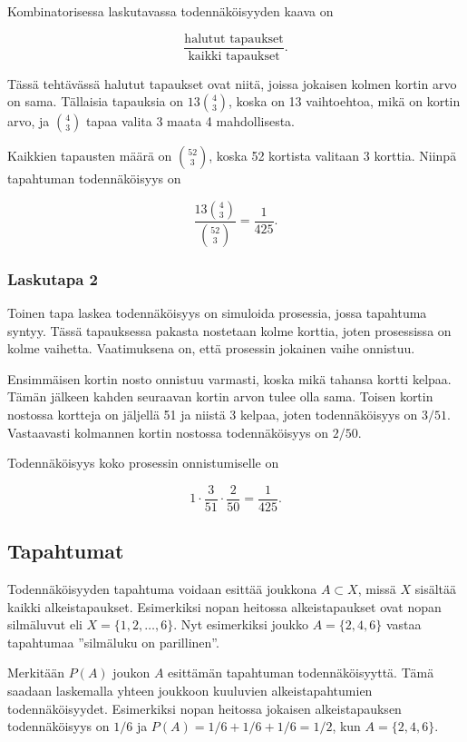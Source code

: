 Kombinatorisessa laskutavassa
todennäköisyyden kaava on

\[\frac{\textrm{halutut tapaukset}}{\textrm{kaikki tapaukset}}.\]

Tässä tehtävässä halutut tapaukset ovat niitä,
joissa jokaisen kolmen kortin arvo on sama.
Tällaisia tapauksia on $13 {4 \choose 3}$,
koska on 13 vaihtoehtoa, mikä on kortin arvo,
ja ${4 \choose 3}$ tapaa valita 3 maata 4 mahdollisesta.

Kaikkien tapausten määrä on ${52 \choose 3}$,
koska 52 kortista valitaan 3 korttia.
Niinpä tapahtuman todennäköisyys on

\[\frac{13 {4 \choose 3}}{{52 \choose 3}} = \frac{1}{425}.\]

\subsubsection*{Laskutapa 2}

Toinen tapa laskea todennäköisyys on simuloida prosessia,
jossa tapahtuma syntyy.
Tässä tapauksessa pakasta nostetaan kolme korttia,
joten prosessissa on kolme vaihetta.
Vaatimuksena on, että prosessin jokainen vaihe onnistuu.

Ensimmäisen kortin nosto onnistuu varmasti,
koska mikä tahansa kortti kelpaa.
Tämän jälkeen kahden seuraavan kortin
arvon tulee olla sama.
Toisen kortin nostossa kortteja on jäljellä 51
ja niistä 3 kelpaa, joten todennäköisyys on $3/51$.
Vastaavasti kolmannen kortin nostossa
todennäköisyys on $2/50$.

Todennäköisyys koko prosessin onnistumiselle on

\[1 \cdot \frac{3}{51} \cdot \frac{2}{50} = \frac{1}{425}.\]

\subsection{Tapahtumat}

Todennäköisyyden tapahtuma voidaan
esittää joukkona $A \subset X$,
missä $X$ sisältää kaikki alkeistapaukset.
Esimerkiksi nopan heitossa alkeistapaukset
ovat nopan silmäluvut eli $X=\{1,2,\ldots,6\}$.
Nyt esimerkiksi joukko
$A=\{2,4,6\}$ vastaa tapahtumaa ''silmäluku on parillinen''.

Merkitään $P(A)$ joukon $A$
esittämän tapahtuman todennäköisyyttä.
Tämä saadaan laskemalla yhteen
joukkoon kuuluvien alkeistapahtumien todennäköisyydet.
Esimerkiksi nopan heitossa jokaisen
alkeistapauksen todennäköisyys on $1/6$
ja $P(A)=1/6+1/6+1/6=1/2$, kun $A=\{2,4,6\}$.

